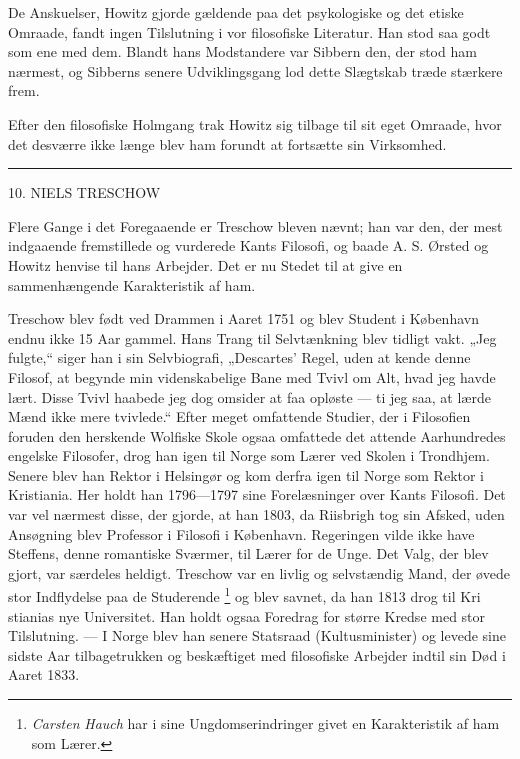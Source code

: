 \documentclass[12pt,a4paper,openany]{book}
\newcommand{\opage}[1]{\marginnote{\footnotesize\textit{[#1]}}}
\begin{document}
De Anskuelser, Howitz gjorde gældende paa det psykologiske og det etiske
Omraade, fandt ingen Tilslutning i vor filosofiske Literatur. Han stod saa godt
som ene med dem. Blandt hans Modstandere var Sibbern den, der stod ham nærmest,
og Sibberns senere Udviklingsgang lod dette Slægtskab træde stærkere frem.

Efter den filosofiske Holmgang trak Howitz sig tilbage til sit eget Omraade,
hvor det desværre ikke længe blev ham forundt at fortsætte sin Virksomhed.

\begin{center}\rule{2cm}{0.4pt}\end{center}

\setcounter{footnote}{0}%
\opage{89}

\begin{center}\large 10. NIELS TRESCHOW\end{center}

Flere Gange i det Foregaaende er Treschow bleven nævnt; han var den, der mest
indgaaende fremstillede og vurderede Kants Filosofi, og baade A. S. Ørsted og
Howitz henvise til hans Arbejder. Det er nu Stedet til at give en
sammenhængende Karakteristik af ham.

Treschow blev født ved Drammen i Aaret 1751 og blev Student i København endnu
ikke 15 Aar gammel. Hans Trang til Selvtænkning blev tidligt vakt. „Jeg
fulgte,“ siger han i sin Selvbiografi, „Descartes' Regel, uden at kende denne
Filosof, at begynde min videnskabelige Bane med Tvivl om Alt, hvad jeg havde
lært. Disse Tvivl haabede jeg dog omsider at faa opløste --- ti jeg saa, at
lærde Mænd ikke mere tvivlede.“ Efter meget omfattende Studier, der i
Filosofien foruden den herskende Wolfiske Skole ogsaa omfattede det attende
Aarhundredes engelske Filosofer, drog han igen til Norge som Lærer ved Skolen i
Trondhjem. Senere blev han Rektor i Helsingør og kom derfra igen til Norge som
Rektor i Kristiania. Her holdt han 1796---1797 sine Forelæsninger over Kants
Filosofi. Det var vel nærmest disse, der gjorde, at han 1803, da Riisbrigh tog
sin Afsked, uden Ansøgning blev Professor i Filosofi i København. Regeringen
vilde ikke have Steffens, denne romantiske Sværmer, til Lærer for de Unge. Det
Valg, der blev gjort, var særdeles heldigt. Treschow var en livlig og
selvstændig Mand, der øvede stor Indflydelse paa de Studerende%
\footnote[1]{\emph{Carsten} \emph{Hauch} har i sine Ungdomserindringer givet en
Karakteristik af ham som Lærer.} og blev savnet, da han 1813 drog til Kri%
\setcounter{footnote}{0}%
\opage{90}stianias nye Universitet. Han holdt ogsaa Foredrag for større Kredse
med stor Tilslutning. --- I Norge blev han senere Statsraad (Kultusminister) og
levede sine sidste Aar tilbagetrukken og beskæftiget med filosofiske Arbejder
indtil sin Død i Aaret 1833.
\end{document}
